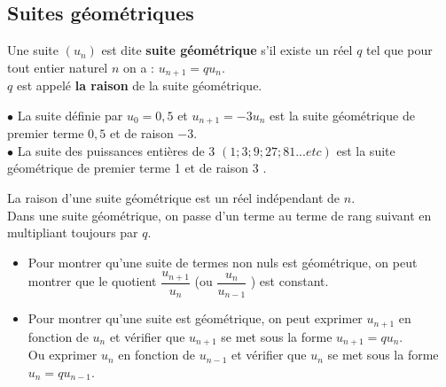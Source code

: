 \subsection{ Suites géométriques}



 \begin{definition}
 Une suite $(u_{n})$ est dite   \textbf{suite géométrique} s'il existe un réel $ q $ tel que   pour tout entier naturel $n$ on a : \; $u_{n+1}=qu_{n}$.\\
$q$ est appelé  \textbf{la raison} de la suite géométrique.
\end{definition}

\medskip


\begin{example}

$ \bullet $ La suite définie  par  $ u_{0}=0,5 $ et $ u_{n+1}=-3u_{n} $ est la suite géométrique  de premier terme $0,5   $ et de raison $ -3 $.\\
$\bullet $ La suite des  puissances entières de 3\;  $ (1;3;9;27;81...etc) $ est la suite géométrique  de premier terme 1 et de raison 3 .

\end{example}


\begin{remark}

La raison d'une suite géométrique est un réel indépendant de $ n$.\\  Dans une suite géométrique, on passe d'un terme au terme de rang suivant en multipliant toujours  par $ q$. 
\end{remark}
\medskip

\begin{methode}
\begin{itemize}
\item [\textbullet] Pour montrer qu'une suite de termes non nuls est géométrique, on peut  montrer que le quotient \; $ \dfrac{u_{n+1}}{u_{n}} $ \; (ou\; $ \dfrac{u_{n}}{u_{n-1}} $ )\;  est constant.
 \item [\textbullet] Pour montrer qu'une suite est géométrique, on peut  exprimer $ u_{n+1} $ en fonction de  $ u_{n}$ et vérifier que  $ u_{n+1} $ se met sous la forme $ u_{n+1}=qu_{n} $. \\
Ou  exprimer $ u_{n} $ en fonction de  $ u_{n-1}$ et vérifier que  $ u_{n} $ se met sous la forme   $ u_{n}=qu_{n-1} $. 
 \end{itemize}
 \end{methode} 
 
